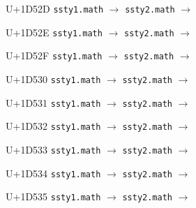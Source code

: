 \documentclass{article}
\begin{document}
\begin{substitutions}
\goodbreak

U+1D52D  \linebreak
    \texttt{ssty1.math} $\to$  \linebreak
    \texttt{ssty2.math} $\to$  

\goodbreak

U+1D52E  \linebreak
    \texttt{ssty1.math} $\to$  \linebreak
    \texttt{ssty2.math} $\to$  

\goodbreak

U+1D52F  \linebreak
    \texttt{ssty1.math} $\to$  \linebreak
    \texttt{ssty2.math} $\to$  

\goodbreak

U+1D530  \linebreak
    \texttt{ssty1.math} $\to$  \linebreak
    \texttt{ssty2.math} $\to$  

\goodbreak

U+1D531  \linebreak
    \texttt{ssty1.math} $\to$  \linebreak
    \texttt{ssty2.math} $\to$  

\goodbreak

U+1D532  \linebreak
    \texttt{ssty1.math} $\to$  \linebreak
    \texttt{ssty2.math} $\to$  

\goodbreak

U+1D533  \linebreak
    \texttt{ssty1.math} $\to$  \linebreak
    \texttt{ssty2.math} $\to$  

\goodbreak

U+1D534  \linebreak
    \texttt{ssty1.math} $\to$  \linebreak
    \texttt{ssty2.math} $\to$  

\goodbreak

U+1D535  \linebreak
    \texttt{ssty1.math} $\to$  \linebreak
    \texttt{ssty2.math} $\to$  


\end{substitutions}
\end{document}
